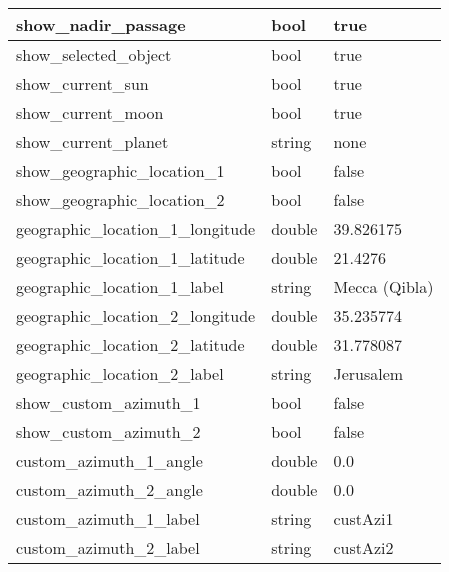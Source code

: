 \begin{longtabu} {l|l|l}
show\_nadir\_passage           &bool        & true  \\\midrule
show\_selected\_object         &bool        & true  \\\midrule
show\_current\_sun             &bool        & true  \\\midrule
show\_current\_moon            &bool        & true  \\\midrule
show\_current\_planet          &string      & none  \\\midrule
show\_geographic\_location\_1  &bool        & false         \\\midrule
show\_geographic\_location\_2  &bool        & false         \\\midrule
geographic\_location\_1\_longitude &double  & 39.826175     \\\midrule
geographic\_location\_1\_latitude  &double  & 21.4276       \\\midrule
geographic\_location\_1\_label     &string  & Mecca (Qibla) \\\midrule
geographic\_location\_2\_longitude &double  & 35.235774     \\\midrule
geographic\_location\_2\_latitude  &double  & 31.778087     \\\midrule
geographic\_location\_2\_label     &string  & Jerusalem     \\\midrule
show\_custom\_azimuth\_1       &bool        & false    \\\midrule
show\_custom\_azimuth\_2       &bool        & false    \\\midrule
custom\_azimuth\_1\_angle      &double      & 0.0      \\\midrule
custom\_azimuth\_2\_angle      &double      & 0.0      \\\midrule
custom\_azimuth\_1\_label      &string      & custAzi1 \\\midrule
custom\_azimuth\_2\_label      &string      & custAzi2 \\\bottomrule
\end{longtabu}


% 
% 
% 


